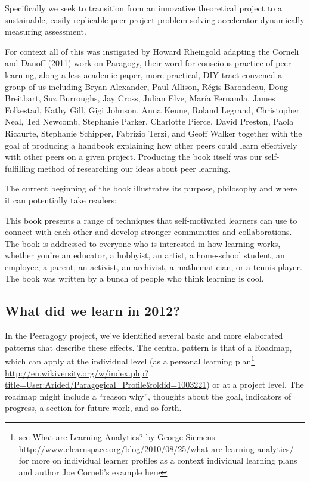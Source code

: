 \documentclass{acm_proc_article-sp}
\begin{document}
Specifically we seek to transition from an innovative theoretical project to a sustainable, easily replicable peer project problem solving accelerator dynamically measuring assessment.

For context all of this was instigated by Howard Rheingold adapting the Corneli and Danoff (2011) work on Paragogy, their word for conscious practice of peer learning, along a less academic paper, more practical, DIY tract convened a group of us including Bryan Alexander, Paul Allison, R\'egis Barondeau, Doug Breitbart, Suz Burroughs, Jay Cross, Julian Elve, Mar\'ia Fernanda, James Folkestad, Kathy Gill, Gigi Johnson, Anna Keune, Roland Legrand, Christopher Neal, Ted Newcomb, Stephanie Parker, Charlotte Pierce, David Preston, Paola Ricaurte, Stephanie Schipper, Fabrizio Terzi, and Geoff Walker together with the goal of producing a handbook explaining how other peers could learn effectively with other peers on a given project. Producing the book itself was our self-fulfilling method of researching our ideas about peer learning.

The current beginning of the book illustrates its purpose, philosophy and where it can potentially take readers:

This book presents a range of techniques that self-motivated learners can use to connect with each other and develop stronger communities and collaborations. The book is addressed to everyone who is interested in how learning works, whether you’re an educator, a hobbyist, an artist, a home-school student, an employee, a parent, an activist, an archivist, a mathematician, or a tennis player.  The book was written by a bunch of people who think learning is cool.

\subsection{What did we learn in 2012?}

In the Peeragogy project, we've identified several basic and more elaborated patterns that describe these effects. The central pattern is that of a Roadmap, which can apply at the individual level (as a personal learning plan\footnote{see What are Learning Analytics? by George Siemens \url{http://www.elearnspace.org/blog/2010/08/25/what-are-learning-analytics/} for more on individual learner profiles as a context individual learning plans and author Joe Corneli's example here} \url{http://en.wikiversity.org/w/index.php?title=User:Arided/Paragogical\_Profile&oldid=1003221}) or at a project level. The roadmap might include a ``reason why'', thoughts about the goal, indicators of progress, a section for future work, and so forth. 
\end{document}
